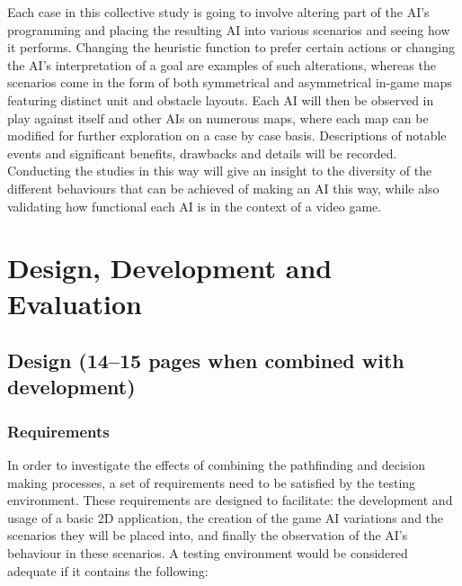 \documentclass[11pt, a4paper]{article}
\begin{document}
Each case in this collective study is going to involve altering part of the AI's programming and placing the resulting AI into various scenarios and seeing how it performs. Changing the heuristic function to prefer certain actions or changing the AI's interpretation of a goal are examples of such alterations, whereas the scenarios come in the form of both symmetrical and asymmetrical in-game maps featuring distinct unit and obstacle layouts. Each AI will then be observed in play against itself and other AIs on numerous maps, where each map can be modified for further exploration on a case by case basis. Descriptions of notable events and significant benefits, drawbacks and details will be recorded. Conducting the studies in this way will give an insight to the diversity of the different behaviours that can be achieved of making an AI this way, while also validating how functional each AI is in the context of a video game.

\section {Design, Development and Evaluation}
\label{sec:designDevelopmentAndEvaluation}

\subsection{Design (14--15 pages when combined with development)}
\label{subsec:design}

\subsubsection{Requirements}
\label{subsubsec:requirements}

In order to investigate the effects of combining the pathfinding and decision making processes, a set of requirements need to be satisfied by the testing environment. These requirements are designed to facilitate: the development and usage of a basic 2D application, the creation of the game AI variations and the scenarios they will be placed into, and finally the observation of the AI's behaviour in these scenarios. A testing environment would be considered adequate if it contains the following:
\end{document}
